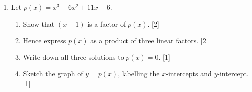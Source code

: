 \documentclass[12pt, twoside]{article}
\begin{document}
\begin{enumerate}[itemsep=0.15cm]

\vspace{0.3cm}

\item[6.] [Maximum mark: 6]

Let $p(x) = x^3 - 6x^2 + 11x - 6$.

\begin{enumerate}[itemsep=0.15cm]
  \item Show that $(x - 1)$ is a factor of $p(x)$. \hfill [2]
  \item Hence express $p(x)$ as a product of three linear factors. \hfill [2]
  \item Write down all three solutions to $p(x) = 0$. \hfill [1]
  \item Sketch the graph of $y = p(x)$, labelling the
  $x$-intercepts and $y$-intercept. \hfill [1]
\end{enumerate}


\end{enumerate}
\end{document}
